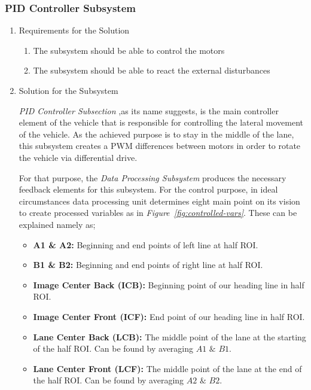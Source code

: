 \documentclass[a4paper,12pt]{article}
\begin{document}
		
		
		\subsubsection{PID Controller Subsystem}
		
			\begin{enumerate}
				\item {Requirements for the Solution}
			
				\begin{enumerate}
						\item The subsystem should be able to control the motors
						\item The subsystem should be able to react the external disturbances
					\end{enumerate} 
					
				\item {Solution for the Subsystem}
				
	\textit{PID Controller Subsection} ,as its name suggests, is the main controller element of the vehicle that is responsible for controlling the lateral movement of the vehicle. As the achieved purpose is to stay in the middle of the lane, this subsystem creates a PWM differences between motors in order to rotate the vehicle via differential drive. 
	
	For that purpose, the \textit{Data Processing Subsystem} produces the necessary feedback elements for this subsystem. For the control purpose, in ideal circumstances data processing unit determines eight main point on its vision to create processed variables as in \textit{Figure~\ref{fig:controlled-vars}}. These can be explained namely as;
	\begin{itemize}
		\item \textbf{A1 \& A2:} Beginning and end points of left line at half ROI.
		\item \textbf{B1 \& B2:} Beginning and end points of right line at half ROI.	
		\item \textbf{Image Center Back (ICB):} Beginning point of our heading line in half ROI.
		\item \textbf{Image Center Front (ICF):} End point of our heading line in half ROI.  
		\item \textbf{Lane Center Back (LCB):} The middle point of the lane at the starting of the half ROI. Can be found by averaging $A1$ $\&$ $B1$.
		\item \textbf{Lane Center Front (LCF):} The middle point of the lane at the end of the half ROI. Can be found by averaging $A2$ $\&$ $B2$.
	\end{itemize}	   
				

\end{enumerate}
\end{document}
